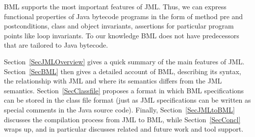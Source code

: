 BML supports the most important features of JML. Thus, we can express
functional properties of Java bytecode programs in the form of method
pre and postconditions, class and object invariants, assertions for
particular program points like loop invariants. To our knowledge BML
does not have predecessors that are tailored to Java bytecode.

Section~\ref{SecJMLOverview} gives a quick summary of the main
features of JML. Section~\ref{SecBML} then gives a detailed account of
BML, describing its syntax, the relationship with JML and where its
semantics differs from the JML semantics. Section~\ref{SecClassfile}
proposes a format in which BML specifications can be stored in the
class file format (just as JML specifications can be written as
special comments in the Java source code). Finally,
Section~\ref{SecJMLtoBML} discusses the compilation process from JML
to BML, while Section~\ref{SecConcl} wraps up, and in particular
discusses related and future work and tool support.


